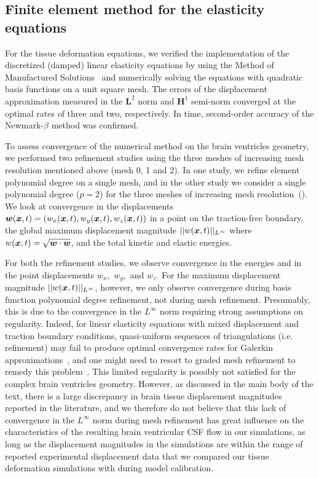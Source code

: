 \documentclass{template}
\begin{document}
\subsection{Finite element method for the elasticity equations}\label{sec:tissue_model_verification}
For the tissue deformation equations, we verified the implementation of the
discretized (damped) linear elasticity equations by using the
Method of Manufactured Solutions~\citep{Roache2001CodeSolutions}
and numerically solving the equations with quadratic basis functions on a unit square mesh.
The errors of the displacement approximation measured in the $\bm{L}^2$ norm and
$\bm{H}^1$ semi-norm converged at the optimal rates of three
and two, respectively. In time, second-order accuracy of the 
Newmark-$\beta$ method was confirmed.

To assess convergence of the numerical method on the brain ventricles geometry,
we performed two refinement studies using the three meshes of increasing
mesh resolution mentioned above (mesh 0, 1 and 2). 
In one study, we refine element polynomial degree on a single mesh,
and in the other study we consider a single polynomial degree ($p=2$) for the three 
meshes of increasing mesh resolution~().
We look at convergence in the displacements
$\bm{w}(\bm{x}, t) = (w_x(\bm{x}, t), w_y(\bm{x}, t), w_z(\bm{x}, t))$
in a point on the traction-free boundary,
the global maximum displacement magnitude $||w(\bm{x}, t)||_{L^{\infty}}$
where $w(\bm{x}, t) = \sqrt{\bm{w}\cdot\bm{w}}$, and the total kinetic and elastic energies.

For both the refinement studies, we observe convergence in the energies and in the
point displacements $w_x,$ $w_y,$ and $w_z.$
For the maximum displacement magnitude $||w(\bm{x}, t)||_{L^{\infty}}$, however,
we only observe convergence during basis function polynomial degree refinement,
not during mesh refinement. Presumably, this is due to the convergence
in the $L^{\infty}$ norm requiring strong assumptions on regularity.
Indeed, for linear elasticity equations with 
mixed displacement and traction boundary conditions, quasi-uniform sequences of
triangulations (i.e. refinement) may fail to produce optimal convergence rates
for Galerkin approximations~\citep{mazzucato2010well, wahlbin1984sharpness}, and
one might need to resort to graded mesh refinement to remedy this problem~\citep{apel1998finite}.
This limited regularity is possibly not satisfied for the complex brain
ventricles geometry. However, as discussed in the main body of the text,
there is a large discrepancy in brain tissue displacement magnitudes 
reported in the literature, and we therefore do not believe that this lack of
convergence in the $L^{\infty}$ norm during mesh refinement 
has great influence on the characteristics of the resulting
brain ventricular CSF flow in our simulations, as long as the displacement
magnitudes in the simulations are within the range of reported experimental
displacement data that we compared our tissue deformation simulations with
during model calibration.
\end{document}
